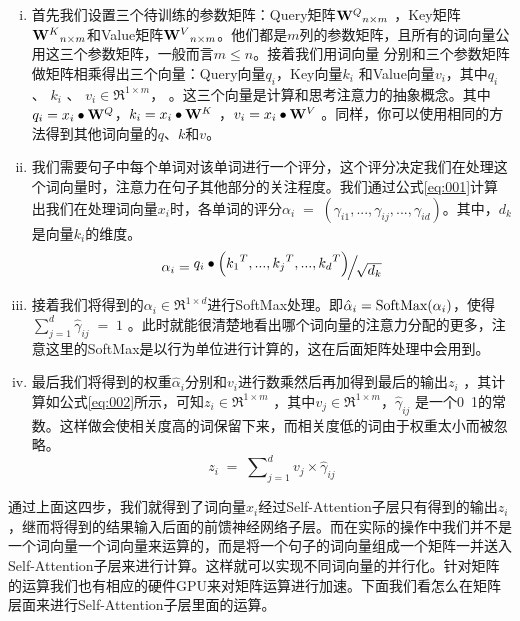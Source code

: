\documentclass[]{article}
\begin{document}
\begin{enumerate}[i.]
	\item 首先我们设置三个待训练的参数矩阵：Query矩阵${{\bf{W}}^Q}_{n \times m}$ ，Key矩阵${{\bf{W}}^K}_{n \times m}$和Value矩阵${{\bf{W}}^V}_{n \times m}$。他们都是$ m $列的参数矩阵，且所有的词向量公用这三个参数矩阵，一般而言$m \le n$。接着我们用词向量 分别和三个参数矩阵做矩阵相乘得出三个向量：Query向量$ q_i $，Key向量$ k_i $ 和Value向量$ v_i $，其中${q_i}$ 、 ${k_i}$ 、 ${v_i} \in {\Re ^{1 \times m}}$， 。这三个向量是计算和思考注意力的抽象概念。其中 ${q_i}\;{\rm{ = }}\;{x_i} \bullet {{\bf{W}}^Q}$，${k_i}\;{\rm{ = }}\;{x_i} \bullet {{\bf{W}}^K}$ ，${v_i}\;{\rm{ = }}\;{x_i} \bullet {{\bf{W}}^V}$ 。同样，你可以使用相同的方法得到其他词向量的$ q $、$ k $和$ v $。
	\item 我们需要句子中每个单词对该单词进行一个评分，这个评分决定我们在处理这个词向量时，注意力在句子其他部分的关注程度。我们通过公式\eqref{eq:001}计算出我们在处理词向量$ x_i $时，各单词的评分${\alpha _i}\; = \;\left( {{\gamma _{i1}},...,{\gamma _{ij}},...,{\gamma _{id}}} \right)$。其中，$ d_k $是向量$ k_i $的维度。
	\begin{equation}
		{\alpha _i}\;{\rm{ = }}\;{\raise0.6ex\hbox{${{q_i} \bullet \left( {{k_1}^T,...,{k_j}^T,...,{k_d}^T} \right)}$} \!\mathord{\left/
				{\vphantom {{{q_i} \bullet \left( {{k_1}^T,...,{k_j}^T,...,{k_d}^T} \right)} {\sqrt {{d_k}} }}}\right.\kern-\nulldelimiterspace}
			\!\lower0.6ex\hbox{${\sqrt {{d_k}} }$}}
		\label{eq:001}
	\end{equation}
	\item 接着我们将得到的${\alpha _i} \in {\Re ^{1 \times d}}$进行SoftMax处理。即${\hat \alpha _i}\;{\rm{ = }}\;{\rm{SoftMax(}}{\alpha _i}{\rm{)}}$，使得$\sum\nolimits_{j = 1}^d {{{\hat \gamma }_{ij}}} \; = \;1$ 。此时就能很清楚地看出哪个词向量的注意力分配的更多，注意这里的SoftMax是以行为单位进行计算的，这在后面矩阵处理中会用到。
	\item 最后我们将得到的权重${\hat \alpha _i}$分别和${v_i}$进行数乘然后再加得到最后的输出${z_i}$ ，其计算如公式\eqref{eq:002}所示，可知${z_i} \in {\Re ^{1 \times m}}$ ，其中${v_j} \in {\Re ^{1 \times m}}$，${\hat \gamma _{ij}}$ 是一个0~1的常数。这样做会使相关度高的词保留下来，而相关度低的词由于权重太小而被忽略。
	\begin{equation}
		{z_i}\; = \;\sum\nolimits_{j = 1}^d {{v_j} \times {{\hat \gamma }_{ij}}} 
		\label{eq:002}
	\end{equation}
\end{enumerate}

通过上面这四步，我们就得到了词向量$ x_i $经过Self-Attention子层只有得到的输出$ z_i $，继而将得到的结果输入后面的前馈神经网络子层。而在实际的操作中我们并不是一个词向量一个词向量来运算的，而是将一个句子的词向量组成一个矩阵一并送入Self-Attention子层来进行计算。这样就可以实现不同词向量的并行化。针对矩阵的运算我们也有相应的硬件GPU来对矩阵运算进行加速。下面我们看怎么在矩阵层面来进行Self-Attention子层里面的运算。
\end{document}
